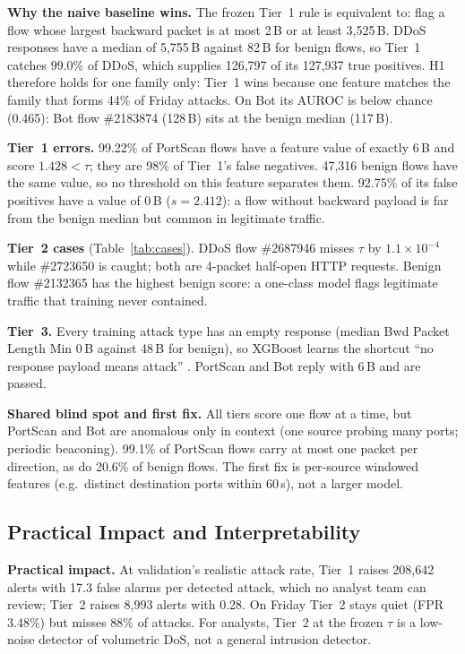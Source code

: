 \documentclass[11pt]{article}
\begin{document}
\textbf{Why the naive baseline wins.} The frozen Tier~1 rule is equivalent to: flag a flow whose largest backward packet is at most 2\,B or at least 3,525\,B. DDoS responses have a median of 5,755\,B against 82\,B for benign flows, so Tier~1 catches 99.0\% of DDoS, which supplies 126,797 of its 127,937 true positives. H1 therefore holds for one family only: Tier~1 wins because one feature matches the family that forms 44\% of Friday attacks. On Bot its AUROC is below chance (0.465): Bot flow \#2183874 (128\,B) sits at the benign median (117\,B).

\textbf{Tier~1 errors.} 99.22\% of PortScan flows have a feature value of exactly 6\,B and score $1.428<\tau$; they are 98\% of Tier~1's false negatives. 47,316 benign flows have the same value, so no threshold on this feature separates them. 92.75\% of its false positives have a value of 0\,B ($s=2.412$): a flow without backward payload is far from the benign median but common in legitimate traffic.

\textbf{Tier~2 cases} (Table~\ref{tab:cases}). DDoS flow \#2687946 misses $\tau$ by $1.1{\times}10^{-4}$ while \#2723650 is caught; both are 4-packet half-open HTTP requests. Benign flow \#2132365 has the highest benign score: a one-class model flags legitimate traffic that training never contained.

\textbf{Tier~3.} Every training attack type has an empty response (median Bwd Packet Length Min 0\,B against 48\,B for benign), so XGBoost learns the shortcut ``no response payload means attack'' \citep{geirhos2020}. PortScan and Bot reply with 6\,B and are passed.

\textbf{Shared blind spot and first fix.} All tiers score one flow at a time, but PortScan and Bot are anomalous only in context (one source probing many ports; periodic beaconing). 99.1\% of PortScan flows carry at most one packet per direction, as do 20.6\% of benign flows. The first fix is per-source windowed features (e.g.\ distinct destination ports within 60\,s), not a larger model.

\subsection{Practical Impact and Interpretability}

\textbf{Practical impact.} At validation's realistic attack rate, Tier~1 raises 208,642 alerts with 17.3 false alarms per detected attack, which no analyst team can review; Tier~2 raises 8,993 alerts with 0.28. On Friday Tier~2 stays quiet (FPR 3.48\%) but misses 88\% of attacks. For analysts, Tier~2 at the frozen $\tau$ is a low-noise detector of volumetric DoS, not a general intrusion detector.
\end{document}
